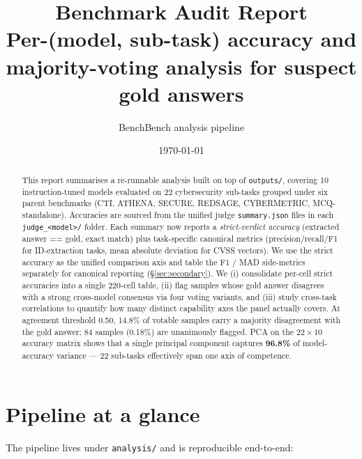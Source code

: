 \documentclass[10pt,a4paper]{article}
\title{\textbf{Benchmark Audit Report}\\[2pt]
\large Per-(model, sub-task) accuracy and majority-voting analysis for suspect gold answers}
\author{BenchBench analysis pipeline}
\date{\today}
\begin{document}
\maketitle

\begin{abstract}
This report summarises a re-runnable analysis built on top of \texttt{outputs/}, covering 10 instruction-tuned models evaluated on 22 cybersecurity sub-tasks grouped under six parent benchmarks (CTI, ATHENA, SECURE, REDSAGE, CYBERMETRIC, MCQ-standalone). Accuracies are sourced from the unified judge \texttt{summary.json} files in each \texttt{judge\_<model>/} folder. Each summary now reports a \emph{strict-verdict accuracy} (extracted answer == gold, exact match) plus task-specific canonical metrics (precision/recall/F1 for ID-extraction tasks, mean absolute deviation for CVSS vectors). We use the strict accuracy as the unified comparison axis and table the F1 / MAD side-metrics separately for canonical reporting (\S\ref{sec:secondary}). We (i) consolidate per-cell strict accuracies into a single 220-cell table, (ii) flag samples whose gold answer disagrees with a strong cross-model consensus via four voting variants, and (iii) study cross-task correlations to quantify how many distinct capability axes the panel actually covers. At agreement threshold 0.50, 14.8\% of votable samples carry a majority disagreement with the gold answer; 84 samples (0.18\%) are unanimously flagged. PCA on the \mbox{$22\times 10$} accuracy matrix shows that a single principal component captures \textbf{96.8\%} of model-accuracy variance --- 22 sub-tasks effectively span one axis of competence.
\end{abstract}

\section{Pipeline at a glance}

The pipeline lives under \texttt{analysis/} and is reproducible end-to-end:
\end{document}
